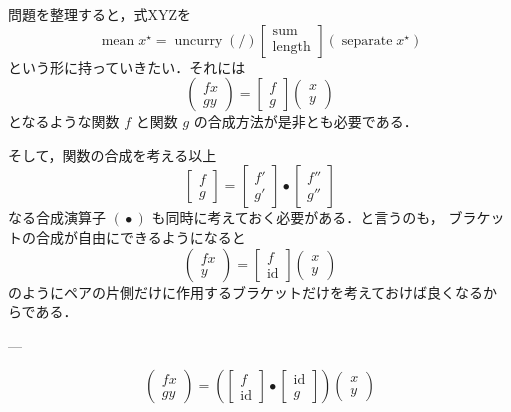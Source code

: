 \documentclass[a5paper,twoside,fleqn,draft]{jsbook}
\newcommand{\mSpecialFunc}[1]{#1}
\DeclareMathOperator{\mId}{\mSpecialFunc{id}}
\DeclareMathOperator{\mLength}{\mSpecialFunc{length}}
\DeclareMathOperator{\mMean}{\mSpecialFunc{mean}}
\DeclareMathOperator{\mSeparate}{\mSpecialFunc{separate}}
\DeclareMathOperator{\mSum}{\mSpecialFunc{sum}}
\DeclareMathOperator{\mUncurry}{\mSpecialFunc{uncurry}}
\DeclareMathOperator{\mCompCat}{\bullet}
\newcommand{\mPairWith}[2]{\begin{pmatrix}#1\\#2\end{pmatrix}}
\newcommand{\mList}[1]{{#1}^\mathrm{\star}}
\begin{document}
問題を整理すると，式XYZを
\begin{equation}
  \mMean\mList{x}
  =\mUncurry(/)\begin{bmatrix}
    \mSum\\
    \mLength
  \end{bmatrix}
  (\mSeparate\mList{x})
\end{equation}
という形に持っていきたい．それには
\begin{equation}
  \mPairWith{fx}{gy}
  =\begin{bmatrix}f
  \\
  g
  \end{bmatrix}
  \mPairWith{x}{y}
\end{equation}
となるような関数 $f$ と関数 $g$ の合成方法が是非とも必要である．

そして，関数の合成を考える以上
\begin{equation}
  \begin{bmatrix}
    f\\
    g
  \end{bmatrix}
  =
  \begin{bmatrix}
    f'\\
    g'
  \end{bmatrix}
  \mCompCat
  \begin{bmatrix}
    f''\\
    g''
  \end{bmatrix}
\end{equation}
なる合成演算子 $(\mCompCat)$ も同時に考えておく必要がある．と言うのも，
ブラケットの合成が自由にできるようになると
\begin{equation}
  \begin{pmatrix}
    fx\\
    y
  \end{pmatrix}
  =
  \begin{bmatrix}
    f\\
    \mId
  \end{bmatrix}
  \begin{pmatrix}
    x\\
    y
  \end{pmatrix}
\end{equation}
のようにペアの片側だけに作用するブラケットだけを考えておけば良くなるか
らである．

---

\begin{equation}
  \begin{pmatrix}
    fx\\
    gy
  \end{pmatrix}
  =
  \left(
  \begin{bmatrix}
    f\\
    \mId
  \end{bmatrix}
  \mCompCat
  \begin{bmatrix}
    \mId\\
    g
  \end{bmatrix}
  \right)
  \begin{pmatrix}
    x\\
    y
  \end{pmatrix}
\end{equation}
\end{document}
